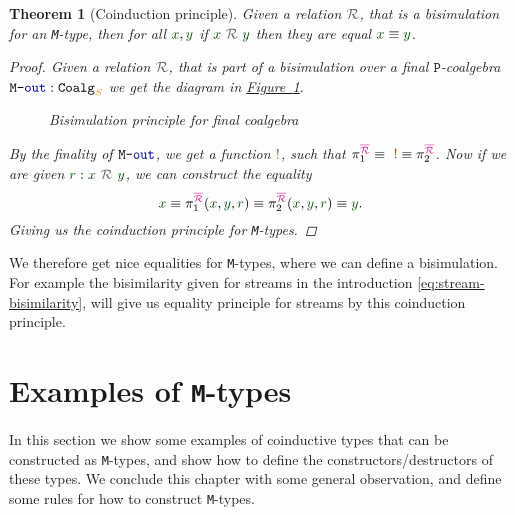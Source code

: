 \documentclass[twoside,11pt,openright]{report}
\theoremstyle{plain} %
\newtheorem{thm}{Theorem}[section]
\theoremstyle{definition}
\theoremstyle{remark}
\newcommand*{\figref}[1]{\hyperref[fig:#1]{Figure~\ref*{fig:#1}}}
\newcommand*{\term}[1]{\textcolor{green!30!black}{#1}} %
\newcommand*{\type}[1]{\textcolor{magenta!90!black}{#1}}
\newcommand*{\container}[1]{\textcolor{orange}{#1}}
\newcommand*{\coalg}[2]{#1\texttt{-}#2}
\newcommand*{\relation}[1]{\textcolor{gray!75!black}{\ensuremath{\mathtt{#1}}}}
\newcommand*{\constant}[1]{\textcolor{orange!60!black}{\ensuremath{\mathtt{#1}}}}
\newcommand*{\function}[1]{\textcolor{blue!60!black}{\ensuremath{\mathtt{#1}}}}
\newcommand*{\typeformer}[1]{\ensuremath{\mathtt{#1}}}
\newcommand*{\functor}[1]{\ensuremath{\mathbf{\mathtt{#1}}}}
\begin{document}
\begin{thm}[Coinduction principle]
  \label{thm:M-coinduction-principle}
  Given a relation \(\relation{\mathcal{R}}\), that is a bisimulation for an \texttt{M}-type, then for all \(\term{x},\term{y}\) if \(\term{x}~\relation{\mathcal{R}}~\term{y}\) then they are equal \(\term{x} \equiv \term{y}\).  
  \begin{proof}
    Given a relation \(\relation{\mathcal{R}}\), that is part of a bisimulation over a final \(\functor{P}\)-coalgebra \(\coalg{\typeformer{M}}{\function{out}}:\mathtt{Coalg}_{\container{S}}\) we get the diagram in \figref{final-coalgebra-coinduction}.
    \begin{figure}[h]
      \centering
      \caption{Bisimulation principle for final coalgebra}
      \label{fig:final-coalgebra-coinduction}
    \end{figure}
    By the finality of \(\coalg{\typeformer{M}}{\function{out}}\), we get a function \(\constant{!}\), such that \(\pi_1^{\type{\overline{\mathcal{R}}}} \equiv ~\constant{!} \equiv \pi_2^{\type{\overline{\mathcal{R}}}}\). Now if we are given \(\term{r} : \term{x}~\relation{\mathcal{R}}~\term{y}\), we can construct the equality
    \begin{equation}
      \term{x} \equiv \pi_1^{\type{\overline{\mathcal{R}}}} (\term{x}, \term{y}, \term{r}) \equiv \pi_2^{\type{\overline{\mathcal{R}}}} (\term{x}, \term{y}, \term{r}) \equiv \term{y}.
    \end{equation}
    Giving us the coinduction principle for \texttt{M}-types.
  \end{proof}
\end{thm}
\noindent We therefore get nice equalities for \texttt{M}-types, where we can define a bisimulation. For example the bisimilarity given for streams in the introduction \eqref{eq:stream-bisimilarity}, will give us equality principle for streams by this coinduction principle.


\chapter{Examples of \texttt{M}-types}
\label{ch:M-types-examples}
In this section we show some examples of coinductive types that can be constructed as \texttt{M}-types, and show how to define the constructors/destructors of these types. We conclude this chapter with some general observation, and define some rules for how to construct \texttt{M}-types. 
\end{document}
